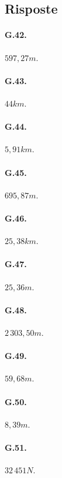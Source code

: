 \subsection{Risposte}
\begin{multicols}{3}
 \paragraph{G.42.}$597,27\unit{m}$.

\paragraph{G.43.}$44\unit{km}$.

\paragraph{G.44.}$5,91\unit{km}$.

\paragraph{G.45.}$695,87\unit{m}$.

\paragraph{G.46.}$25,38\unit{km}$.

\paragraph{G.47.}$25,36\unit{m}$.

\paragraph{G.48.}$2\,303,50\unit{m}$.

\paragraph{G.49.}${59,68\unit{m}}$.

\paragraph{G.50.}$8,39\unit{m}$.

\paragraph{G.51.}$32\,451\unit{N}$.


\end{multicols}
